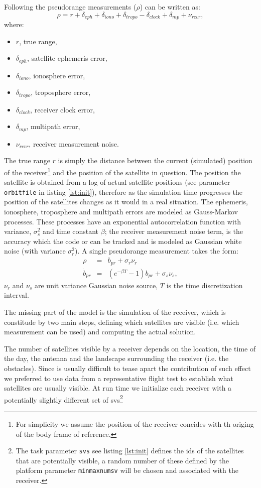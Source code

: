 \documentclass[a4paper,11pt]{report}
\begin{document}
Following \cite{rankin1994anerror} the pseudorange measurements ($\rho$) can be written as:  
\begin{equation}
\rho=r+\delta_{eph}+\delta_{iono}+\delta_{tropo}-\delta_{clock}+\delta_{mp}+\nu_{rcvr},
\end{equation}
where:
\begin{itemize}
\item $r$, true range,
\item $\delta_{eph}$, satellite ephemeris error,
\item $\delta_{iono}$, ionosphere error,
\item $\delta_{tropo}$, troposphere error,
\item $\delta_{clock}$, receiver clock error,
\item $\delta_{mp}$, multipath error,
\item $\nu_{rcvr}$, receiver measurement noise.
\end{itemize}
The true range $r$ is simply the distance between the current (simulated) position of the receiver\footnote{For simplicity we assume the position of the receiver concides with th origing of the body frame of reference.} and the position of the satellite in question. The position the satellite is obtained from a log of actual satellite positions (see parameter \texttt{orbitfile} in listing \ref{lst:init}), therefore as the simulation time progresses the position of the satellites changes as it would in a real situation.
The ephemeris, ionosphere, troposphere and multipath errors are modeled as Gauss-Markov processes. These processes have an
exponential autocorrelation function with variance, $\sigma^2_s$ and time constant $\beta$; the receiver measurement noise term, is the accuracy which the code or can be tracked and is modeled as Gaussian white noise (with variance $\sigma^2_r$).
A single pseudorange measurement takes the form:
\begin{eqnarray}
\rho & = & b_{pr} + \sigma_r\nu_{r}\\
\dot{b}_{pr} & = & (e^{-\beta T}-1) b_{pr} + \sigma_s\nu_{s},
\end{eqnarray}
$\nu_r$ and $\nu_s$ are unit variance Gaussian noise source, $T$ is the time discretization interval.  

The missing part of the model is the simulation of the receiver, which is constitude by two main steps, defining which satellites are visible (i.e. which measurement can be used) and computing the actual solution.

The number of satellites visible by a receiver depends on the location, the time of the day, the antenna and the landscape surrounding the receiver (i.e. the obstacles). Since is usually difficult to tease apart the contribution of such effect we preferred to use data from a representative flight test to establish what satellites are usually visible.
At run time we initialize each receiver with a potentially slightly different set of svs\footnote{The task parameter \texttt{svs}  see listing \ref{lst:init} defines the ids of the satellites that are potentially visible, a random number of these defined by the platform parameter \texttt{minmaxnumsv} will be chosen and associated with the receiver.}
\end{document}
